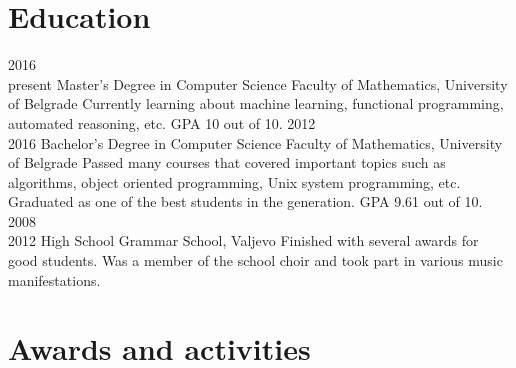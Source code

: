 \documentclass{my_cv}
\begin{document}
\section{Education}
\begin{entrylist}
  \entry
    {2016~\textemdash \\present}
    {Master's Degree in Computer Science}
    {Faculty of Mathematics, University of Belgrade}
    {Currently learning about machine learning, functional programming, automated reasoning, etc. GPA 10 out of 10.}
  \entry
    {2012~\textemdash \\2016}
    {Bachelor's Degree in Computer Science}
    {Faculty of Mathematics, University of Belgrade}
    {Passed many courses that covered important topics such as algorithms, object oriented programming, Unix system programming, etc. Graduated as one of the best students in the generation. GPA 9.61 out of 10.}
  \entry
    {2008~\textemdash \\2012}
    {High School}
    {Grammar School, Valjevo}
    {Finished with several awards for good students. Was a member of the school choir and took part in various music manifestations.}
\end{entrylist}

\section{Awards and activities}

\bodyfont
\begin{aplist}
\end{aplist}
\end{document}
